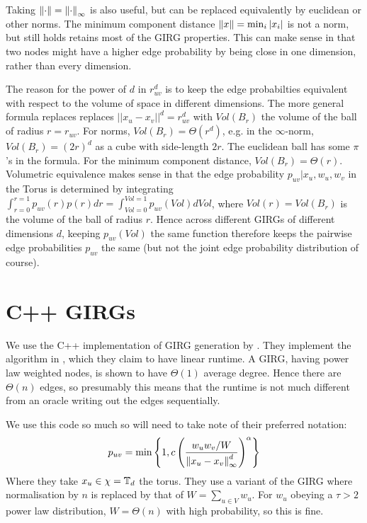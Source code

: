 Taking $\left\lVert \cdot\right\rVert = \left\lVert \cdot\right\rVert_\infty$ is also useful, but can be replaced equivalently by euclidean or other norms. The minimum component distance $\left\lVert x\right\rVert = \min_i |x_i|$ is not a norm, but still holds retains most of the GIRG properties. This can make sense in that two nodes might have a higher edge probability by being close in one dimension, rather than every dimension.

The reason for the power of $d$ in $r_{uv}^d$ is to keep the edge probabilties equivalent with respect to the volume of space in different dimensions. The more general formula replaces replaces $||x_u - x_v||^d = r_{uv}^d$ with $Vol(B_r)$ the volume of the ball of radius $r=r_{uv}$.
For norms, $Vol(B_r) = \Theta(r^d)$, e.g. in the $\infty$-norm, $Vol(B_r) = (2r)^d$ as a cube with side-length $2r$. The euclidean ball has some $\pi$'s in the formula. For the minimum component distance, $Vol(B_r) = \Theta(r)$. Volumetric equivalence makes sense in that the edge probability $p_{uv} | x_u, w_u, w_v$ in the Torus is determined by integrating $\int_{r=0}^{r=1} p_{uv}(r) p(r) dr = \int_{Vol=0}^{Vol=1} p_{uv}(Vol) dVol$, where $Vol(r) = Vol(B_r)$ is the volume of the ball of radius $r$. Hence across different GIRGs of different dimensions $d$, keeping $p_{uv}(Vol)$ the same function therefore keeps the pairwise edge probabilities $p_{uv}$ the same (but not the joint edge probability distribution of course).




\section{C++ GIRGs}
We use the C++ implementation of GIRG generation by \cite{blasius2022efficiently}.
They implement the algorithm in \cite{bringmann2019geometric}, which they claim to have linear runtime.
A GIRG, having power law weighted nodes, is shown to have $\Theta(1)$ average degree.
Hence there are $\Theta(n)$ edges, so presumably this means that the runtime is not much different from an oracle writing out the edges sequentially.

We use this code so much so will need to take note of their preferred notation:
\begin{equation}
    p_{uv} = \min \left \{ 
        1,
        c \left (
            \frac{w_u w_v / W}{\left\lVert x_u - x_v\right\rVert_\infty^d}
        \right )^\alpha    
    \right \}
\end{equation}
Where they take $x_u \in \chi = \mathbb{T}_d$ the torus. They use a variant of the GIRG where normalisation by $n$ is replaced by that of $W = \sum_{u \in V} w_u$. For $w_u$ obeying a $\tau > 2$ power law distribution, $W = \Theta(n)$ with high probability, so this is fine.

